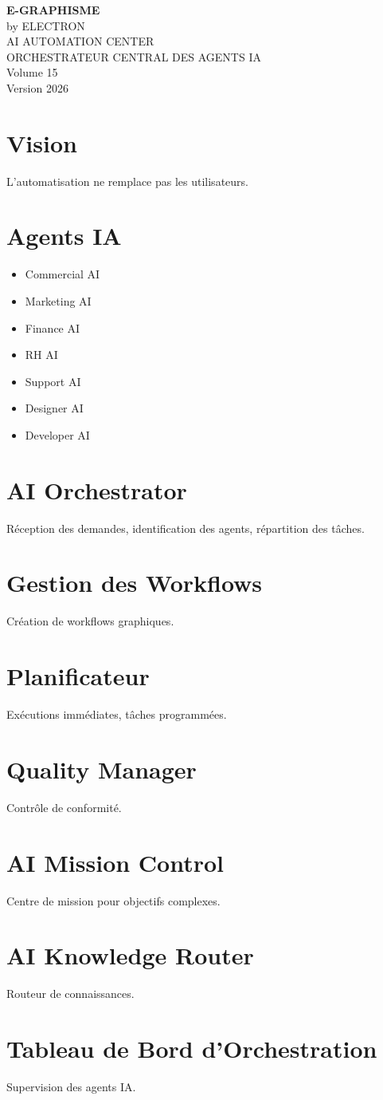 \documentclass[12pt,a4paper,oneside]{book}
\begin{document}
\begin{titlepage}
\begin{center}
\vspace*{3cm}
{\Huge\bfseries\color{bleuIA}E-GRAPHISME}\\[0.3cm]
{\LARGE by ELECTRON}\\[2cm]
{\huge AI AUTOMATION CENTER}\\[0.3cm]
{\huge ORCHESTRATEUR CENTRAL DES AGENTS IA}\\[1cm]
{\Large Volume 15}\\[3cm]
{\Large Version 2026}
\end{center}
\end{titlepage}

\chapter{Vision}
L'automatisation ne remplace pas les utilisateurs.

\chapter{Agents IA}
\begin{itemize}
\item Commercial AI
\item Marketing AI
\item Finance AI
\item RH AI
\item Support AI
\item Designer AI
\item Developer AI
\end{itemize}

\chapter{AI Orchestrator}
Réception des demandes, identification des agents, répartition des tâches.

\chapter{Gestion des Workflows}
Création de workflows graphiques.

\chapter{Planificateur}
Exécutions immédiates, tâches programmées.

\chapter{Quality Manager}
Contrôle de conformité.

\chapter{AI Mission Control}
Centre de mission pour objectifs complexes.

\chapter{AI Knowledge Router}
Routeur de connaissances.

\chapter{Tableau de Bord d'Orchestration}
Supervision des agents IA.
\end{document}
